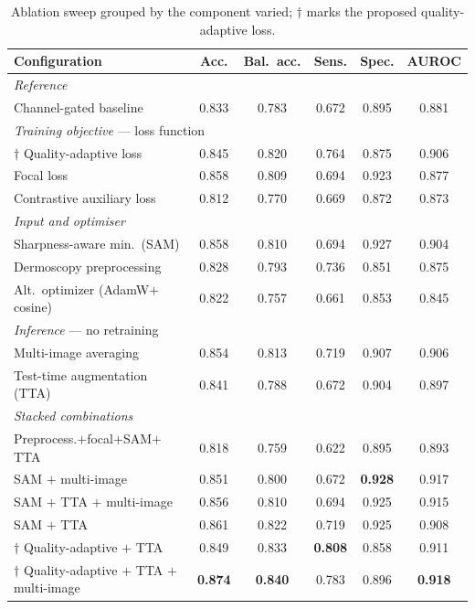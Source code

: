 \documentclass[conference]{IEEEtran}
\begin{document}
\begin{table}[htbp]
\caption{Ablation sweep grouped by the component varied; $\dagger$ marks the proposed quality-adaptive loss.}
\label{tab:sweep}
\centering
\scriptsize
\setlength{\tabcolsep}{2pt}
\begin{tabular}{|l|c|c|c|c|c|}
\hline
\textbf{Configuration} & \textbf{Acc.} & \textbf{Bal.\ acc.} & \textbf{Sens.} & \textbf{Spec.} & \textbf{AUROC} \\
\hline
\multicolumn{6}{|l|}{\emph{Reference}} \\
\hline
Channel-gated baseline & 0.833 & 0.783 & 0.672 & 0.895 & 0.881 \\
\hline
\multicolumn{6}{|l|}{\emph{Training objective} --- loss function} \\
\hline
$\dagger$ Quality-adaptive loss & 0.845 & 0.820 & 0.764 & 0.875 & 0.906 \\
Focal loss & 0.858 & 0.809 & 0.694 & 0.923 & 0.877 \\
Contrastive auxiliary loss & 0.812 & 0.770 & 0.669 & 0.872 & 0.873 \\
\hline
\multicolumn{6}{|l|}{\emph{Input and optimiser}} \\
\hline
Sharpness-aware min.\ (SAM) & 0.858 & 0.810 & 0.694 & 0.927 & 0.904 \\
Dermoscopy preprocessing & 0.828 & 0.793 & 0.736 & 0.851 & 0.875 \\
Alt.\ optimizer (AdamW$+$cosine) & 0.822 & 0.757 & 0.661 & 0.853 & 0.845 \\
\hline
\multicolumn{6}{|l|}{\emph{Inference} --- no retraining} \\
\hline
Multi-image averaging & 0.854 & 0.813 & 0.719 & 0.907 & 0.906 \\
Test-time augmentation (TTA) & 0.841 & 0.788 & 0.672 & 0.904 & 0.897 \\
\hline
\multicolumn{6}{|l|}{\emph{Stacked combinations}} \\
\hline
Preprocess.$+$focal$+$SAM$+$TTA & 0.818 & 0.759 & 0.622 & 0.895 & 0.893 \\
SAM $+$ multi-image & 0.851 & 0.800 & 0.672 & \textbf{0.928} & 0.917 \\
SAM $+$ TTA $+$ multi-image & 0.856 & 0.810 & 0.694 & 0.925 & 0.915 \\
SAM $+$ TTA & 0.861 & 0.822 & 0.719 & 0.925 & 0.908 \\
$\dagger$ Quality-adaptive $+$ TTA & 0.849 & 0.833 & \textbf{0.808} & 0.858 & 0.911 \\
$\dagger$ Quality-adaptive $+$ TTA $+$ multi-image & \textbf{0.874} & \textbf{0.840} & 0.783 & 0.896 & \textbf{0.918} \\
\hline
\end{tabular}
\end{table}
\end{document}
